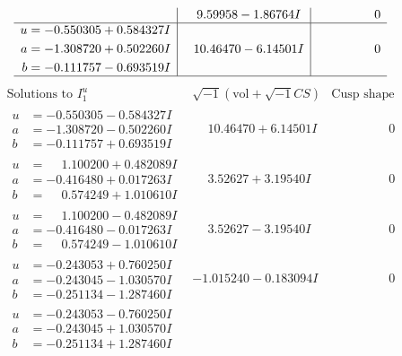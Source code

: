 \documentclass[1p]{elsarticle_modified}
\theoremstyle{definition}
\newcommand{\I}{\sqrt{-1}}
\begin{document}
$$\begin{array}{c|c|c}
 & \phantom{-}9.59958 - 1.86764 I & \phantom{-0.000000 } 0 \\ \hline\begin{aligned}
u &= -0.550305 + 0.584327 I \\
a &= -1.308720 + 0.502260 I \\
b &= -0.111757 - 0.693519 I\end{aligned}
 & \phantom{-}10.46470 - 6.14501 I & \phantom{-0.000000 } 0\\
 \hline 
 \end{array}$$\newpage$$\begin{array}{c|c|c}  
\text{Solutions to }I^u_{1}& \I (\text{vol} + \sqrt{-1}CS) & \text{Cusp shape}\\
 \hline 
\begin{aligned}
u &= -0.550305 - 0.584327 I \\
a &= -1.308720 - 0.502260 I \\
b &= -0.111757 + 0.693519 I\end{aligned}
 & \phantom{-}10.46470 + 6.14501 I & \phantom{-0.000000 } 0 \\ \hline\begin{aligned}
u &= \phantom{-}1.100200 + 0.482089 I \\
a &= -0.416480 + 0.017263 I \\
b &= \phantom{-}0.574249 + 1.010610 I\end{aligned}
 & \phantom{-}3.52627 + 3.19540 I & \phantom{-0.000000 } 0 \\ \hline\begin{aligned}
u &= \phantom{-}1.100200 - 0.482089 I \\
a &= -0.416480 - 0.017263 I \\
b &= \phantom{-}0.574249 - 1.010610 I\end{aligned}
 & \phantom{-}3.52627 - 3.19540 I & \phantom{-0.000000 } 0 \\ \hline\begin{aligned}
u &= -0.243053 + 0.760250 I \\
a &= -0.243045 - 1.030570 I \\
b &= -0.251134 - 1.287460 I\end{aligned}
 & -1.015240 - 0.183094 I & \phantom{-0.000000 } 0 \\ \hline\begin{aligned}
u &= -0.243053 - 0.760250 I \\
a &= -0.243045 + 1.030570 I \\
b &= -0.251134 + 1.287460 I\end{aligned}

\end{array}$$
\end{document}
